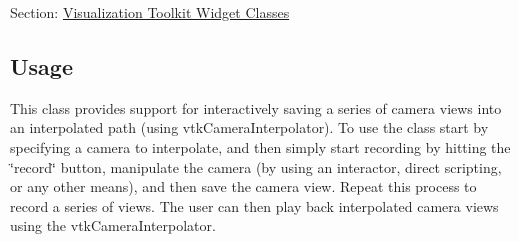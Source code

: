Section\-: \hyperlink{sec_vtkwidgets}{Visualization Toolkit Widget Classes} \hypertarget{vtkwidgets_vtkxyplotwidget_Usage}{}\subsection{Usage}\label{vtkwidgets_vtkxyplotwidget_Usage}
This class provides support for interactively saving a series of camera views into an interpolated path (using vtk\-Camera\-Interpolator). To use the class start by specifying a camera to interpolate, and then simply start recording by hitting the \char`\"{}record\char`\"{} button, manipulate the camera (by using an interactor, direct scripting, or any other means), and then save the camera view. Repeat this process to record a series of views. The user can then play back interpolated camera views using the vtk\-Camera\-Interpolator.

